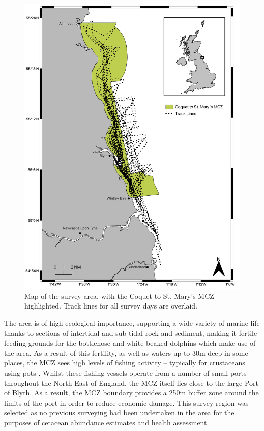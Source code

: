  \begin{figure}
	\begin{center}
		\includegraphics[scale=0.7]{Chapter4/figs/survey_map.pdf}
	\end{center}
	\caption[Map of the survey area, with the Coquet to St. Mary's MCZ highlighted.]{Map of the survey area, with the Coquet to St. Mary's MCZ highlighted. Track lines for all survey days are overlaid.}
	\label{fig:survey-map}
\end{figure}

The area is of high ecological importance, supporting a wide variety of marine life thanks to sections of intertidal and sub-tidal rock and sediment, making it fertile feeding grounds for the bottlenose and white-beaked dolphins which make use of the area. As a result of this fertility, as well as waters up to 30m deep in some places, the MCZ sees high levels of fishing activity -- typically for crustaceans using pots \cite{stephenson_spatial_2017}. Whilst these fishing vessels operate from a number of small ports throughout the North East of England, the MCZ itself lies close to the large Port of Blyth. As a result, the MCZ boundary provides a 250m buffer zone around the limits of the port in order to reduce economic damage. This survey region was selected as no previous surveying had been undertaken in the area for the purposes of cetacean abundance estimates and health assessment.  

